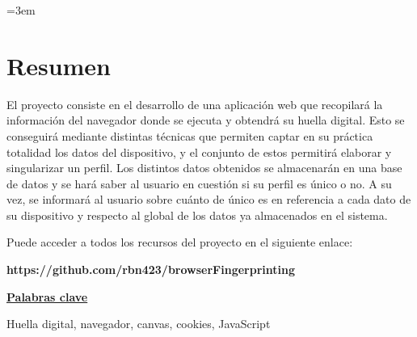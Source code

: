 \parindent=3em
\chapter*{Resumen}

El proyecto consiste en el desarrollo de una aplicación web que recopilará la información del navegador donde se ejecuta y obtendrá su huella digital. Esto se conseguirá mediante distintas técnicas que permiten captar en su práctica totalidad los datos del dispositivo, y el conjunto de estos permitirá elaborar y singularizar un perfil. Los distintos datos obtenidos se almacenarán en una base de datos y se hará saber al usuario en cuestión si su perfil es único o no. A su vez, se informará al usuario sobre cuánto de único es en referencia a cada dato de su dispositivo y respecto al global de los datos ya almacenados en el sistema. \par

Puede acceder a todos los recursos del proyecto en el siguiente enlace: \par
\noindent
\textbf{https://github.com/rbn423/browserFingerprinting} \par
\vspace{12mm}
\noindent
\underline{\Large{\textbf{Palabras clave}}}\par
\vspace{7mm}
\noindent
\normalsize{Huella digital, navegador, canvas, cookies, JavaScript}
